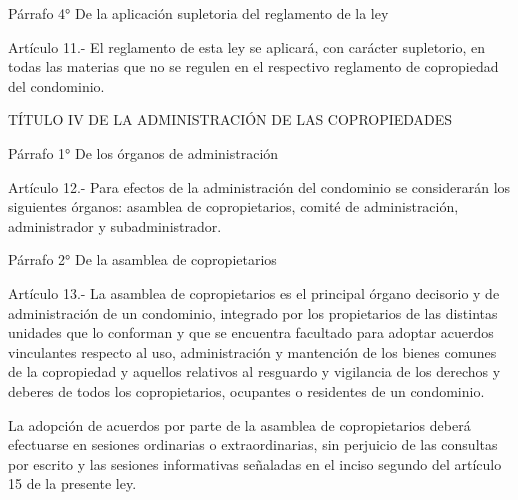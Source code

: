     Párrafo 4°
    De la aplicación supletoria del reglamento de la ley

     
    Artículo 11.- El reglamento de esta ley se aplicará, con carácter supletorio, en todas las materias que no se regulen en el respectivo reglamento de copropiedad del condominio.

    TÍTULO IV
    DE LA ADMINISTRACIÓN DE LAS COPROPIEDADES


    Párrafo 1°
    De los órganos de administración
   
    Artículo 12.- Para efectos de la administración del condominio se considerarán los siguientes órganos: asamblea de copropietarios, comité de administración, administrador y subadministrador.
     
    Párrafo 2°
    De la asamblea de copropietarios

     
    Artículo 13.- La asamblea de copropietarios es el principal órgano decisorio y de administración de un condominio, integrado por los propietarios de las distintas unidades que lo conforman y que se encuentra facultado para adoptar acuerdos vinculantes respecto al uso, administración y mantención de los bienes comunes de la copropiedad y aquellos relativos al resguardo y vigilancia de los derechos y deberes de todos los copropietarios, ocupantes o residentes de un condominio.
     
    La adopción de acuerdos por parte de la asamblea de copropietarios deberá efectuarse en sesiones ordinarias o extraordinarias, sin perjuicio de las consultas por escrito y las sesiones informativas señaladas en el inciso segundo del artículo 15 de la presente ley.
   
